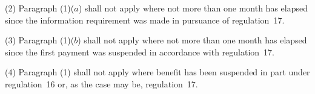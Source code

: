 \documentclass[12pt,a4paper]{article}
\begin{document}
(2) Paragraph (1)($a$) shall not apply where not more than one month has elapsed since the information requirement was made in pursuance of regulation~17.

(3) Paragraph (1)($b$) shall not apply where not more than one month has elapsed since the first payment was suspended in accordance with regulation~17.

(4) Paragraph (1) shall not apply where benefit has been suspended in part under regulation~16 or, as the case may be, regulation~17.

%
%
%
%
%
%
%
\end{document}
